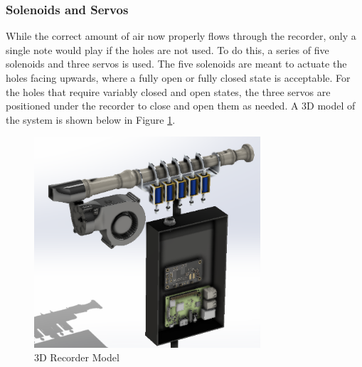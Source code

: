 \documentclass[UTF8, 12pt]{article}
\begin{document}
    \subsubsection{Solenoids and Servos}
    While the correct amount of air now properly flows through the recorder, only a single note would play if the holes are not used. To do this, a series of five solenoids and three servos is used. The five solenoids are meant to actuate the holes facing upwards, where a fully open or fully closed state is acceptable. For the holes that require variably closed and open states, the three servos are positioned under the recorder to close and open them as needed. A 3D model of the system is shown below in Figure \ref{rec_set_fig}.
    \begin{figure}[h]
        \centering
        \includegraphics[width=0.75\textwidth]{rec_setup.png}
        \caption{3D Recorder Model}
        \label{rec_set_fig}
    \end{figure} 
\end{document}
